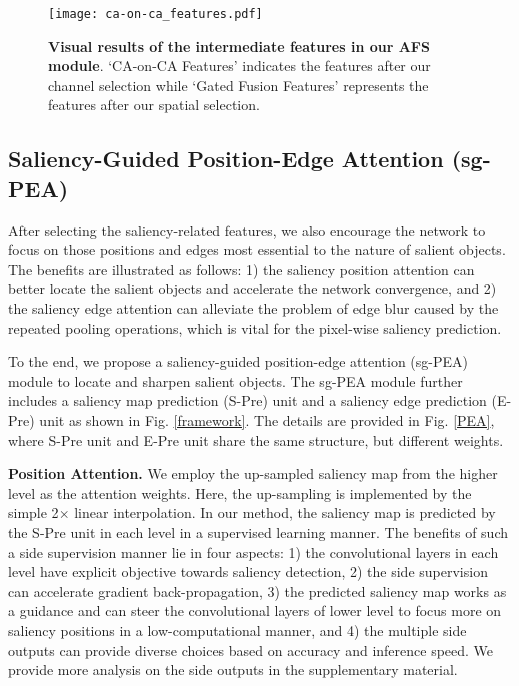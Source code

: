 \documentclass[runningheads]{llncs}
\begin{document}
\begin{figure*}[!t]
	\centering
	\texttt{[image: ca-on-ca\_features.pdf]}
	\caption{\textbf{Visual results of the intermediate features in our AFS module}. `CA-on-CA Features' indicates the features after our channel selection while `Gated Fusion Features' represents the features after our spatial selection.}
	\label{Feature_map}
\end{figure*}


\subsection{Saliency-Guided Position-Edge Attention (sg-PEA)}
After selecting the saliency-related features, we also encourage the network to focus on those positions and edges most essential to the nature of salient objects. The benefits are illustrated as follows:
1) the saliency position attention can better locate the salient objects and accelerate the network convergence, and 2) the saliency edge attention can alleviate the problem of edge blur caused by the repeated pooling operations, which is vital for the pixel-wise saliency prediction.

To the end, we propose a saliency-guided position-edge attention (sg-PEA) module to  locate and sharpen salient objects. The sg-PEA module further includes a saliency map prediction  (S-Pre) unit and a saliency edge prediction (E-Pre) unit as shown in Fig. \ref{framework}. The details are provided in Fig. \ref{PEA}, where  S-Pre unit and E-Pre unit share the same structure, but different weights.


\noindent
\textbf{Position Attention.} We employ the up-sampled saliency map from the higher level as the attention weights. Here, the up-sampling is implemented by the simple 2$\times$ linear interpolation. In our method, the saliency map is predicted by the S-Pre unit in each level in a supervised learning manner.
The benefits of such a side supervision manner lie in four aspects: 1) the convolutional layers in each level have explicit objective towards saliency detection, 2) the side supervision can accelerate gradient back-propagation, 3) the predicted saliency map works as a guidance and can steer the convolutional layers of lower level to focus more on saliency positions in a low-computational manner, and 4) the multiple side outputs can provide diverse choices based on accuracy and inference speed. We provide more analysis on the side outputs in the supplementary material.
\end{document}
